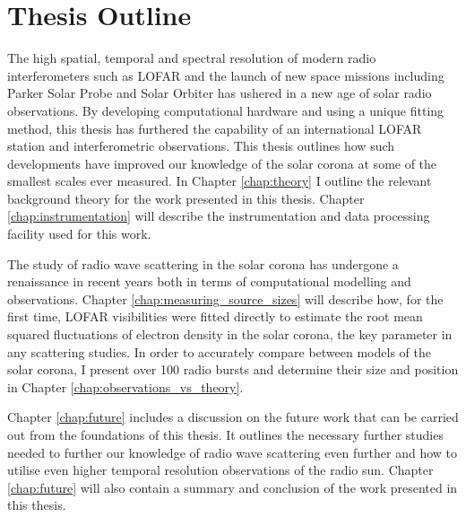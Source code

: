 \section{Thesis Outline}
The high spatial, temporal and spectral resolution of modern radio interferometers such as LOFAR and the launch of new space missions including Parker Solar Probe and Solar Orbiter has ushered in a new age of solar radio observations. By developing computational hardware and using a unique fitting method, this thesis has furthered the capability of an international LOFAR station and interferometric observations. This thesis outlines how such developments have improved our knowledge of the solar corona at some of the smallest scales ever measured. In Chapter \ref{chap:theory} I outline the relevant background theory for the work presented in this thesis. Chapter \ref{chap:instrumentation} will describe the instrumentation and data processing facility used for this work. 
 
The study of radio wave scattering in the solar corona has undergone a renaissance in recent years both in terms of computational modelling and observations. Chapter \ref{chap:measuring_source_sizes} will describe how, for the first time, LOFAR visibilities were fitted directly to estimate the root mean squared fluctuations of electron density in the solar corona, the key parameter in any scattering studies. In order to accurately compare between models of the solar corona, I present over 100 radio bursts and determine their size and position in Chapter \ref{chap:observations_vs_theory}.

Chapter \ref{chap:future} includes a discussion on the future work that can be carried out from the foundations of this thesis. It outlines the necessary further studies needed to further our knowledge of radio wave scattering even further and how to utilise even higher temporal resolution observations of the radio sun. Chapter \ref{chap:future} will also contain a summary and conclusion of the work presented in this thesis.










































